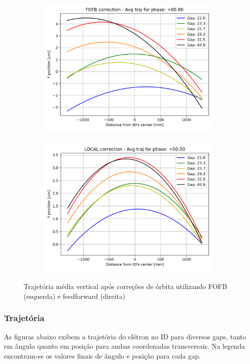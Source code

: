 \documentclass[a4paper,12pt]{article}
\begin{document}
\begin{figure}[H]
\begin{subfigure}{0.5\textwidth}
\includegraphics[width=0.9\linewidth, height=7cm]{figs/phase0 vertical-avg-traj-FOFB.png} 
\label{fig:subim10yc}
\end{subfigure}
\begin{subfigure}{0.5\textwidth}
\includegraphics[width=0.9\linewidth, height=7cm]{figs/phase0 vertical-avg-traj-LOCAL.png}
\label{fig:subim20yc}
\end{subfigure}
\caption{Trajetória média vertical após correções de órbita utilizando FOFB (esquerda) e feedforward (direita)}
\label{fig:corry}
\end{figure}







\subsubsection{Trajetória}
As figuras abaixo exibem a trajetória do elétron no ID para diversos gaps, tanto em ângulo quanto em posição para ambas coordenadas transversais. Na legenda encontram-se os valores finais de ângulo e posição para cada gap.
\end{document}
